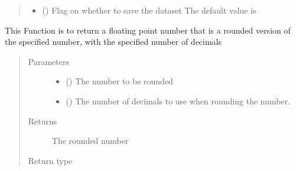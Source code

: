 \documentclass[letterpaper,10pt,english]{sphinxmanual}
\begin{document}
\begin{fulllineitems}
\begin{fulllineitems}
\begin{quote}
\begin{description}
\begin{itemize}
\item {} 
 () \textendash{} Flag on whether to save the dataset The default value is 

\end{itemize}

\end{description}\end{quote}

\end{fulllineitems}


\begin{fulllineitems}
\label{\detokenize{AgentTools.util:AgentTools.util.OutputUtil.OutputUtil.exact_rounding}}
This Function is to return a floating point number that is a rounded version of the specified number, with the specified number of decimals
\begin{quote}\begin{description}
\item[{Parameters}] \leavevmode\begin{itemize}
\item {} 
 () \textendash{} The number to be rounded

\item {} 
 () \textendash{} The number of decimals to use when rounding the number.

\end{itemize}

\item[{Returns}] \leavevmode
The rounded number

\item[{Return type}] \leavevmode
{}


\end{description}
\end{quote}
\end{fulllineitems}
\end{fulllineitems}
\end{document}
